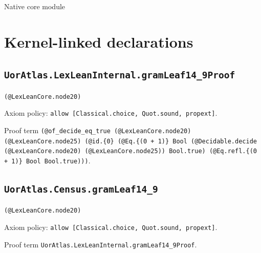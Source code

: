 \documentclass[11pt]{article}
\begin{document}
\begin{center}{\LARGE Native core module}\end{center}
\section*{Kernel-linked declarations}
\subsection*{\texttt{UorAtlas.LexLeanInternal.gramLeaf14\_9Proof}}
\noindent\texttt{(@LexLeanCore.node20)}\par
\noindent Axiom policy: \texttt{allow [Classical.choice, Quot.sound, propext]}.\par
\noindent Proof term \texttt{(@of\_decide\_eq\_true (@LexLeanCore.node20) (@LexLeanCore.node25) (@id.\{0\} (@Eq.\{(0 + 1)\} Bool (@Decidable.decide (@LexLeanCore.node20) (@LexLeanCore.node25)) Bool.true) (@Eq.refl.\{(0 + 1)\} Bool Bool.true)))}.\par
\subsection*{\texttt{UorAtlas.Census.gramLeaf14\_9}}
\noindent\texttt{(@LexLeanCore.node20)}\par
\noindent Axiom policy: \texttt{allow [Classical.choice, Quot.sound, propext]}.\par
\noindent Proof term \texttt{UorAtlas.LexLeanInternal.gramLeaf14\_9Proof}.\par
\end{document}
